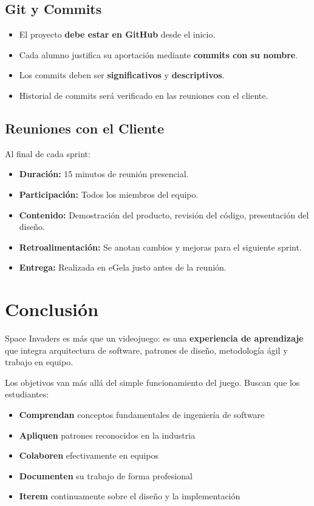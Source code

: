\documentclass[12pt, a4paper]{article}
\begin{document}
\subsection{Git y Commits}

\begin{itemize}[leftmargin=2em]
    \item El proyecto \textbf{debe estar en GitHub} desde el inicio.
    \item Cada alumno justifica su aportación mediante \textbf{commits con su nombre}.
    \item Los commits deben ser \textbf{significativos} y \textbf{descriptivos}.
    \item Historial de commits será verificado en las reuniones con el cliente.
\end{itemize}

\subsection{Reuniones con el Cliente}

Al final de cada sprint:

\begin{itemize}[leftmargin=2em]
    \item \textbf{Duración:} 15 minutos de reunión presencial.
    \item \textbf{Participación:} Todos los miembros del equipo.
    \item \textbf{Contenido:} Demostración del producto, revisión del código, presentación del diseño.
    \item \textbf{Retroalimentación:} Se anotan cambios y mejoras para el siguiente sprint.
    \item \textbf{Entrega:} Realizada en eGela justo antes de la reunión.
\end{itemize}

\section{Conclusión}

Space Invaders es más que un videojuego: es una \textbf{experiencia de aprendizaje} que integra arquitectura de software, patrones de diseño, metodología ágil y trabajo en equipo. 

Los objetivos van más allá del simple funcionamiento del juego. Buscan que los estudiantes:

\begin{itemize}[leftmargin=2em]
    \item \textbf{Comprendan} conceptos fundamentales de ingeniería de software
    \item \textbf{Apliquen} patrones reconocidos en la industria
    \item \textbf{Colaboren} efectivamente en equipos
    \item \textbf{Documenten} su trabajo de forma profesional
    \item \textbf{Iterem} continuamente sobre el diseño y la implementación
\end{itemize}
\end{document}
